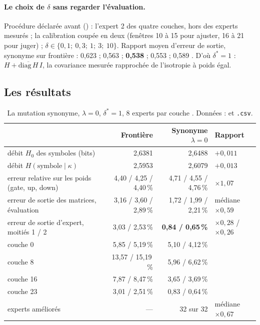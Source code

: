 \paragraph{Le choix de $\delta$ sans regarder l'évaluation.} Procédure déclarée avant () : l'expert 2 des quatre couches, hors des experts mesurés ; la calibration coupée en deux (fenêtres 10 à 15 pour ajuster, 16 à 21 pour juger) ; $\delta \in \{0{,}1;\ 0{,}3;\ 1;\ 3;\ 10\}$. Rapport moyen d'erreur de sortie, synonyme sur frontière : 0,623 ; 0,563 ; \textbf{0,538} ; 0,553 ; 0,589 \mes. D'où $\delta^\ast = 1$ : $H + \overline{\mathrm{diag}\,H}\, I$, la covariance mesurée rapprochée de l'isotropie à poids égal.

\subsection{Les résultats}

\begin{table}[tbp]
\centering\small
\begin{tabular}{l r r l}
\toprule
& Frontière & Synonyme $\lambda = 0$ & Rapport \\
\midrule
débit $H_0$ des symboles (bits) & 2,6381 & 2,6488 & $+0{,}011$ \\
débit $H(\text{symbole}\mid\kappa)$ & 2,5953 & 2,6079 & $+0{,}013$ \\
erreur relative sur les poids (gate, up, down) & 4,40 / 4,25 / 4,40\,\% & 4,71 / 4,55 / 4,76\,\% & $\times 1{,}07$ \\
erreur de sortie des matrices, évaluation & 3,16 / 3,60 / 2,89\,\% & 1,72 / 1,99 / 2,21\,\% & médiane $\times 0{,}59$ \\
erreur de sortie d'expert, moitiés 1 / 2 & 3,03 / 2,53\,\% & \textbf{0,84 / 0,65\,\%} & $\times 0{,}28$ / $\times 0{,}26$ \\
\quad couche 0 & 5,85 / 5,19\,\% & 5,10 / 4,12\,\% & \\
\quad couche 8 & 13,57 / 15,19\,\% & 5,96 / 6,62\,\% & \\
\quad couche 16 & 7,87 / 8,47\,\% & 3,65 / 3,69\,\% & \\
\quad couche 23 & 3,01 / 2,51\,\% & 0,83 / 0,64\,\% & \\
experts améliorés & — & 32 sur 32 & médiane $\times 0{,}67$ \\
\bottomrule
\end{tabular}
\caption[La mutation synonyme sans contrainte d'entropie]{La mutation synonyme, $\lambda = 0$, $\delta^\ast = 1$, 8 experts par couche \mes. Données :  et \texttt{.csv}.}
\label{t3ecl:tab:lam0}
\end{table}

